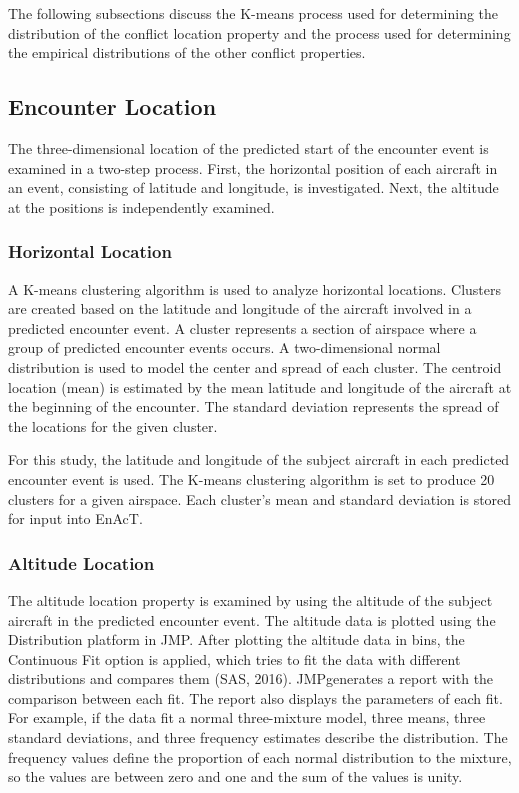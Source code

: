 The following subsections discuss the K-means process used for determining the distribution of the conflict location property and the process used for determining the empirical distributions of the other conflict properties.

\subsection{Encounter Location}
The three-dimensional location of the predicted start of the encounter event is examined in a two-step process. First, the horizontal position of each aircraft in an event, consisting of latitude and longitude, is investigated. Next, the altitude at the positions is independently examined.

\subsubsection{Horizontal Location}
A K-means clustering algorithm is used to analyze horizontal locations. Clusters are created based on the latitude and longitude of the aircraft involved in a predicted encounter event. A cluster represents a section of airspace where a group of predicted encounter events occurs. A two-dimensional normal distribution is used to model the center and spread of each cluster. The centroid location (mean) is estimated by the mean latitude and longitude of the aircraft at the beginning of the encounter. The standard deviation represents the spread of the locations for the given cluster.

For this study, the latitude and longitude of the subject aircraft in each predicted encounter event is used. The K-means clustering algorithm is set to produce 20 clusters for a given airspace. Each cluster’s mean and standard deviation is stored for input into EnAcT.

\subsubsection{Altitude Location}
The altitude location property is examined by using the altitude of the subject aircraft in the predicted encounter event. The altitude data is plotted using the Distribution platform in JMP\textregistered. After plotting the altitude data in bins, the Continuous Fit option is applied, which tries to fit the data with different distributions and compares them (SAS, 2016). JMP\textregistered generates a report with the comparison between each fit. The report also displays the parameters of each fit. For example, if the data fit a normal three-mixture model, three means, three standard deviations, and three frequency estimates describe the distribution. The frequency values define the proportion of each normal distribution to the mixture, so the values are between zero and one and the sum of the values is unity.

